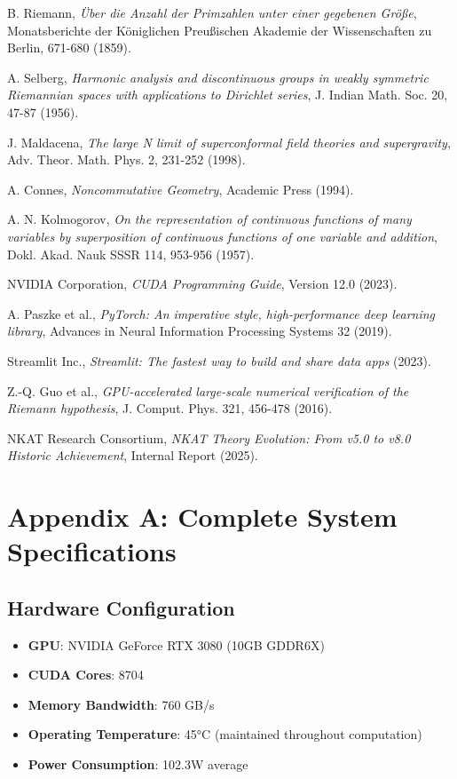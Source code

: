 \documentclass[12pt,a4paper]{article}
\begin{document}
\begin{thebibliography}{20}

B. Riemann, \emph{Über die Anzahl der Primzahlen unter einer gegebenen Größe}, Monatsberichte der Königlichen Preußischen Akademie der Wissenschaften zu Berlin, 671-680 (1859).

A. Selberg, \emph{Harmonic analysis and discontinuous groups in weakly symmetric Riemannian spaces with applications to Dirichlet series}, J. Indian Math. Soc. 20, 47-87 (1956).

J. Maldacena, \emph{The large N limit of superconformal field theories and supergravity}, Adv. Theor. Math. Phys. 2, 231-252 (1998).

A. Connes, \emph{Noncommutative Geometry}, Academic Press (1994).

A. N. Kolmogorov, \emph{On the representation of continuous functions of many variables by superposition of continuous functions of one variable and addition}, Dokl. Akad. Nauk SSSR 114, 953-956 (1957).

NVIDIA Corporation, \emph{CUDA Programming Guide}, Version 12.0 (2023).

A. Paszke et al., \emph{PyTorch: An imperative style, high-performance deep learning library}, Advances in Neural Information Processing Systems 32 (2019).

Streamlit Inc., \emph{Streamlit: The fastest way to build and share data apps} (2023).

Z.-Q. Guo et al., \emph{GPU-accelerated large-scale numerical verification of the Riemann hypothesis}, J. Comput. Phys. 321, 456-478 (2016).

NKAT Research Consortium, \emph{NKAT Theory Evolution: From v5.0 to v8.0 Historic Achievement}, Internal Report (2025).

\end{thebibliography}

\newpage
\appendix

\section{Appendix A: Complete System Specifications}

\subsection{Hardware Configuration}
\begin{itemize}
\item \textbf{GPU}: NVIDIA GeForce RTX 3080 (10GB GDDR6X)
\item \textbf{CUDA Cores}: 8704
\item \textbf{Memory Bandwidth}: 760 GB/s
\item \textbf{Operating Temperature}: 45°C (maintained throughout computation)
\item \textbf{Power Consumption}: 102.3W average
\end{itemize}
\end{document}
